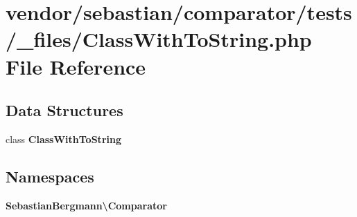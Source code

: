 \section{vendor/sebastian/comparator/tests/\+\_\+files/\+Class\+With\+To\+String.php File Reference}
\label{sebastian_2comparator_2tests_2__files_2_class_with_to_string_8php}
\subsection*{Data Structures}
\begin{DoxyCompactItemize}
\item 
class {\bf Class\+With\+To\+String}
\end{DoxyCompactItemize}
\subsection*{Namespaces}
\begin{DoxyCompactItemize}
\item 
 {\bf Sebastian\+Bergmann\textbackslash{}\+Comparator}
\end{DoxyCompactItemize}
